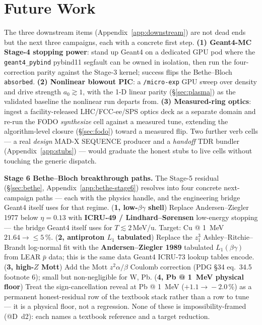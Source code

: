 \documentclass[11pt,a4paper]{article}
\begin{document}
\section{Future Work}
\label{sec:future}

The three downstream items (Appendix~\ref{app:downstream}) are not dead
ends but the next three campaigns, each with a concrete first step.
\textbf{(1) Geant4-MC Stage-4 stopping power}: stand up Geant4 on a
dedicated GPU pod where the \texttt{geant4\_pybind} pybind11 segfault can
be owned in isolation, then run the four-correction parity against the
Stage-3 kernel; success flips the Bethe--Bloch \texttt{absorbed}.
\textbf{(2) Nonlinear blowout PIC}: a \texttt{/micro-exp} GPU sweep over
density and drive strength $a_0\gtrsim 1$, with the 1-D linear parity
(\S\ref{sec:plasma}) as the validated baseline the nonlinear run departs
from. \textbf{(3) Measured-ring optics}: ingest a facility-released
LHC/FCC-ee/SPS optics deck as a separate domain and re-run the FODO
\emph{synthesize} cell against a measured tune, extending the
algorithm-level closure (\S\ref{sec:fodo}) toward a measured flip. Two
further verb cells --- a real \emph{design} MAD-X SEQUENCE producer and a
\emph{handoff} TDR bundler (Appendix~\ref{app:stubs}) --- would graduate
the honest stubs to live cells without touching the generic dispatch.

\smallskip\noindent\textbf{Stage 6 Bethe--Bloch breakthrough paths.}
The Stage-5 residual (\S\ref{sec:bethe}, Appendix~\ref{app:bethe-stage6})
resolves into four concrete next-campaign paths --- each with the
physics handle, and the engineering bridge Geant4 itself uses for that
regime. (\textbf{1, low-$\beta\gamma$ shell}) Replace Andersen--Ziegler
1977 below $\eta\!=\!0.13$ with \textbf{ICRU-49 / Lindhard--Sørensen}
low-energy stopping --- the bridge Geant4 itself uses for
$T\!\lesssim\!2$\,MeV/u. Target: Cu @ \SI{1}{MeV} $21.64\!\to\!\le\!5\,\%$.
(\textbf{2, antiproton $L_1$ tabulated}) Replace the
$z_1^3$ Ashley--Ritchie--Brandt log-normal fit with the
\textbf{Andersen--Ziegler 1989} tabulated $L_1(\beta\gamma)$ from LEAR
$\bar{p}$ data; this is the same data Geant4 ICRU-73 lookup tables
encode. (\textbf{3, high-$Z$ Mott}) Add the Mott $z^2\alpha/\beta$
Coulomb correction (PDG \S34 eq.~34.5 footnote 6); small but
non-negligible for W, Pb. (\textbf{4, Pb @ \SI{1}{MeV} physical floor})
Treat the sign-cancellation reveal at Pb @ \SI{1}{MeV}
($+1.1\!\to\!-2.0\,\%$) as a permanent honest-residual row of the
textbook stack rather than a row to tune --- it is a physical floor, not
a regression. None of these is impossibility-framed (@D~d2): each names
a textbook reference and a target reduction.
\end{document}
